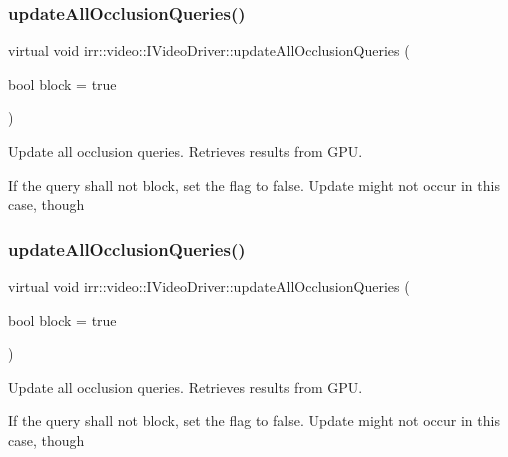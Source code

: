\subsubsection{\texorpdfstring{update\+All\+Occlusion\+Queries()}{updateAllOcclusionQueries()}\hspace{0.1cm}{\footnotesize\ttfamily [1/2]}}
{\footnotesize\ttfamily virtual void irr\+::video\+::\+I\+Video\+Driver\+::update\+All\+Occlusion\+Queries (\begin{DoxyParamCaption}\item[{bool}]{block = {\ttfamily true} }\end{DoxyParamCaption})\hspace{0.3cm}{\ttfamily [pure virtual]}}



Update all occlusion queries. Retrieves results from G\+PU. 

If the query shall not block, set the flag to false. Update might not occur in this case, though \mbox{\label{classirr_1_1video_1_1IVideoDriver_ab611513a8cdb3cc62c29b864de0d1de7}} 
\subsubsection{\texorpdfstring{update\+All\+Occlusion\+Queries()}{updateAllOcclusionQueries()}\hspace{0.1cm}{\footnotesize\ttfamily [2/2]}}
{\footnotesize\ttfamily virtual void irr\+::video\+::\+I\+Video\+Driver\+::update\+All\+Occlusion\+Queries (\begin{DoxyParamCaption}\item[{bool}]{block = {\ttfamily true} }\end{DoxyParamCaption})\hspace{0.3cm}{\ttfamily [pure virtual]}}



Update all occlusion queries. Retrieves results from G\+PU. 

If the query shall not block, set the flag to false. Update might not occur in this case, though \mbox{\label{classirr_1_1video_1_1IVideoDriver_a626061128fcf018516c6d931bd616ea7}} 
